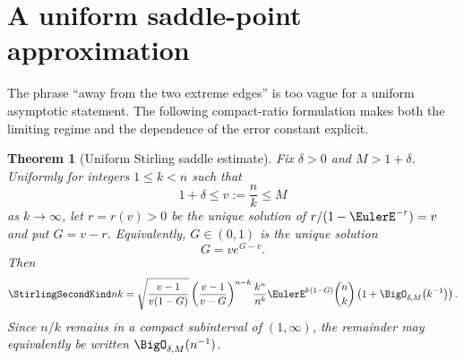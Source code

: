\documentclass[11pt,a4paper,oneside,openany]{book}
\newtheorem{theorem}{Theorem}[chapter]
\theoremstyle{definition}
\theoremstyle{remark}
\begin{document}
\section{A uniform saddle-point approximation}
The phrase ``away from the two extreme edges'' is too vague for a uniform
asymptotic statement.  The following compact-ratio formulation makes both the
limiting regime and the dependence of the error constant explicit.

\begin{theorem}[Uniform Stirling saddle estimate]
\label{thm:stirling-uniform-saddle}
Fix $\delta>0$ and $M>1+\delta$.  Uniformly for integers $1\le k<n$ such
that
\[
 1+\delta\le v:=\frac nk\le M
\]
as $k\to\infty$, let $r=r(v)>0$ be the unique solution of
$r/(1-\EulerE^{-r})=v$ and put $G=v-r$.  Equivalently, $G\in(0,1)$ is the
unique solution
\begin{equation}\label{eq:G-equation}
 G=ve^{G-v}.
\end{equation}
Then
\begin{equation}\label{eq:second-uniform-asymp}
 \StirlingSecondKind nk
 =\sqrt{\frac{v-1}{v(1-G)}}
 \left(\frac{v-1}{v-G}\right)^{n-k}
 \frac{k^n}{n^k}\EulerE^{k(1-G)}\binom nk
 \left(1+\BigO_{\delta,M}\!\left(k^{-1}\right)\right).
\end{equation}
Since $n/k$ remains in a compact subinterval of $(1,\infty)$, the remainder may
equivalently be written $\BigO_{\delta,M}(n^{-1})$.
\end{theorem}
\end{document}
